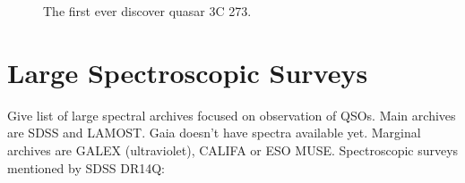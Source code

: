\begin{figure}
	\begin{center}
	\end{center}
	\caption{
		The first ever discover quasar 3C 273.
		}
	\label{3c_273}
\end{figure}


\section{Large Spectroscopic Surveys}

Give list of large spectral archives focused on observation of QSOs.
Main archives are SDSS and LAMOST.
Gaia doesn't have spectra available yet.
Marginal archives are GALEX (ultraviolet), CALIFA or ESO MUSE.
Spectroscopic surveys mentioned by SDSS DR14Q:

